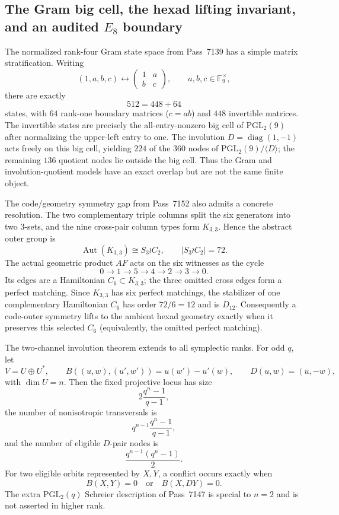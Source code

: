 \subsection{The Gram big cell, the hexad lifting invariant, and an audited $E_8$ boundary}
\label{sec:pass7154-7162-nine-front-e8}

The normalized rank-four Gram state space from Pass~7139 has a simple matrix stratification.  Writing
\[
 (1,a,b,c)\longleftrightarrow
 \begin{pmatrix}1&a\\ b&c\end{pmatrix},
 \qquad a,b,c\in\mathbb F_9^\times,
\]
there are exactly
\[
 \boxed{512=448+64}
\]
states, with $64$ rank-one boundary matrices ($c=ab$) and $448$ invertible matrices.  The invertible states are precisely the all-entry-nonzero big cell of $\mathrm{PGL}_2(9)$ after normalizing the upper-left entry to one.  The involution $D=\operatorname{diag}(1,-1)$ acts freely on this big cell, yielding $224$ of the $360$ nodes of $\mathrm{PGL}_2(9)/\langle D\rangle$; the remaining $136$ quotient nodes lie outside the big cell.  Thus the Gram and involution-quotient models have an exact overlap but are not the same finite object.

The code/geometry symmetry gap from Pass~7152 also admits a concrete resolution.  The two complementary triple columns split the six generators into two $3$-sets, and the nine cross-pair column types form $K_{3,3}$.  Hence the abstract outer group is
\[
 \operatorname{Aut}(K_{3,3})\cong S_3\wr C_2,
 \qquad |S_3\wr C_2|=72.
\]
The actual geometric product $AF$ acts on the six witnesses as the cycle
\[
 0\to1\to5\to4\to2\to3\to0.
\]
Its edges are a Hamiltonian $C_6\subset K_{3,3}$; the three omitted cross edges form a perfect matching.  Since $K_{3,3}$ has six perfect matchings, the stabilizer of one complementary Hamiltonian $C_6$ has order $72/6=12$ and is $D_{12}$.  Consequently a code-outer symmetry lifts to the ambient hexad geometry exactly when it preserves this selected $C_6$ (equivalently, the omitted perfect matching).

The two-channel involution theorem extends to all symplectic ranks.  For odd $q$, let
\[
 V=U\oplus U^*,\qquad
 B((u,w),(u',w'))=u(w')-u'(w),\qquad
 D(u,w)=(u,-w),
\]
with $\dim U=n$.  Then the fixed projective locus has size
\[
 2\frac{q^n-1}{q-1},
\]
the number of nonisotropic transversals is
\[
 q^{n-1}\frac{q^n-1}{q-1},
\]
and the number of eligible $D$-pair nodes is
\[
 \boxed{\frac{q^{n-1}(q^n-1)}2}.
\]
For two eligible orbits represented by $X,Y$, a conflict occurs exactly when
\[
 B(X,Y)=0\quad\text{or}\quad B(X,DY)=0.
\]
The extra $\mathrm{PGL}_2(q)$ Schreier description of Pass~7147 is special to $n=2$ and is not asserted in higher rank.

